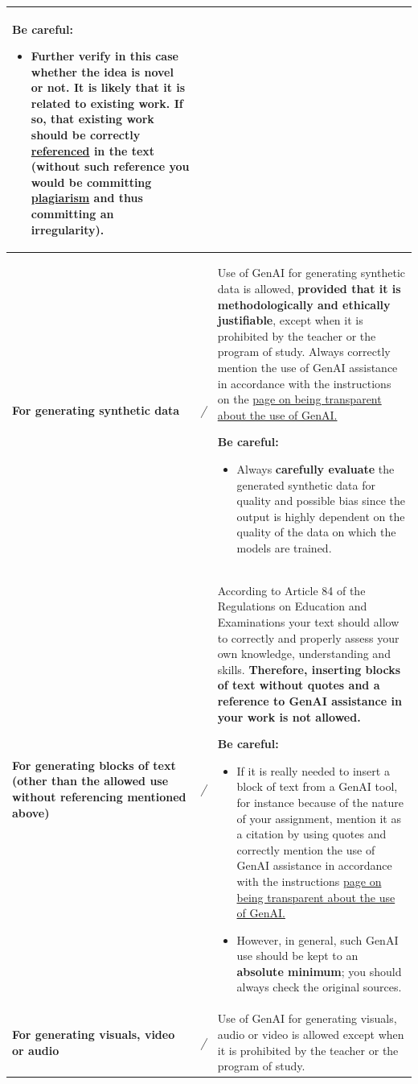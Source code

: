 \begin{longtable}{|p{}|p{}|p{}|}
\medskip
\textbf{Be careful:}
\begin{itemize}
    \item Further verify in this case whether the idea is novel or not. It is likely that it is related to existing work. \textbf{If so, that existing work should be correctly \href{https://bib.kuleuven.be/english/training-and-tutorials/citation}{referenced} in the text} (without such reference you would be committing \href{https://www.kuleuven.be/english/education/plagiarism/index}{plagiarism} and thus committing an irregularity).
\end{itemize}\\ \hline
\textbf{For generating synthetic data} & \textit{/} & Use of GenAI for generating synthetic data is allowed, \textbf{provided that it is methodologically and ethically justifiable}, except when it is prohibited by the teacher or the program of study. Always correctly mention the use of GenAI assistance in accordance with the instructions on the \href{https://www.kuleuven.be/english/education/student/educational-tools/generative-artificial-intelligence#Transparency}{page on being transparent about the use of GenAI.}

\medskip
\textbf{Be careful:}
\begin{itemize}
    \item Always \textbf{carefully evaluate} the generated synthetic data for quality and possible bias since the output is highly dependent on the quality of the data on which the models are trained.
\end{itemize} \\ \hline
\textbf{For generating blocks of text
(other than the allowed use without referencing mentioned above)
} & \textit{/} & According to Article 84 of the Regulations on Education and Examinations your text should allow to correctly and properly assess your own knowledge, understanding and skills. \textbf{Therefore, inserting blocks of text without quotes and a reference to GenAI assistance in your work is not allowed. }

\medskip
\textbf{Be careful:}
\begin{itemize}
    \item If it is really needed to insert a block of text from a GenAI tool, for instance because of the nature of your assignment, mention it as a citation by using quotes and correctly mention the use of GenAI assistance in accordance with the instructions \href{https://www.kuleuven.be/english/education/student/educational-tools/generative-artificial-intelligence#Transparency}{page on being transparent about the use of GenAI.}
    \item However, in general, such GenAI use should be kept to an \textbf{absolute minimum}; you should always check the original sources.
\end{itemize} \\ \hline
\textbf{For generating visuals, video or audio} & \textit{/} & Use of GenAI for generating visuals, audio or video is allowed except when it is prohibited by the teacher or the program of study. 


\end{longtable}
